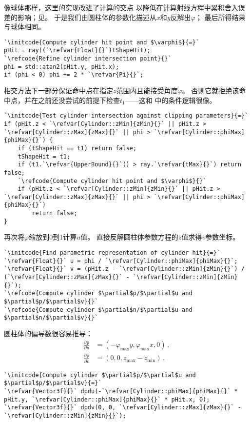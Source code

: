 像球体那样，这里的实现改进了计算的交点
以降低在计算射线方程中累积舍入误差的影响；见。
于是我们由圆柱体的参数化描述从$x$和$y$反解出$\varphi$；
最后所得结果与球体相同。
\begin{lstlisting}
`\initcode{Compute cylinder hit point and $\varphi$}{=}`
pHit = ray((`\refvar{Float}{}`)tShapeHit);
`\refcode{Refine cylinder intersection point}{}`
phi = std::atan2(pHit.y, pHit.x);
if (phi < 0) phi += 2 * `\refvar{Pi}{}`;
\end{lstlisting}

相交方法下一部分保证命中点在指定$z$范围内且能接受角度$\varphi$。
否则它就拒绝该命中点，并在之前还没尝试的前提下检查$t_1$——这和
中的条件逻辑很像。
\begin{lstlisting}
`\initcode{Test cylinder intersection against clipping parameters}{=}`
if (pHit.z < `\refvar[Cylinder::zMin]{zMin}{}` || pHit.z > `\refvar[Cylinder::zMax]{zMax}{}` || phi > `\refvar[Cylinder::phiMax]{phiMax}{}`) {
    if (tShapeHit == t1) return false;
    tShapeHit = t1;
    if (t1.`\refvar{UpperBound}{}`() > ray.`\refvar{tMax}{}`) return false;
    `\refcode{Compute cylinder hit point and $\varphi$}{}`
    if (pHit.z < `\refvar[Cylinder::zMin]{zMin}{}` || pHit.z > `\refvar[Cylinder::zMax]{zMax}{}` || phi > `\refvar[Cylinder::phiMax]{phiMax}{}`)
        return false;
}
\end{lstlisting}

再次将$\varphi$缩放到0到1计算$u$值。
直接反解圆柱体参数方程的$z$值求得$v$参数坐标。
\begin{lstlisting}
`\initcode{Find parametric representation of cylinder hit}{=}`
`\refvar{Float}{}` u = phi / `\refvar[Cylinder::phiMax]{phiMax}{}`;
`\refvar{Float}{}` v = (pHit.z - `\refvar[Cylinder::zMin]{zMin}{}`) / (`\refvar[Cylinder::zMax]{zMax}{}` - `\refvar[Cylinder::zMin]{zMin}{}`);
`\refcode{Compute cylinder $\partial$p/$\partial$u and $\partial$p/$\partial$v}{}`
`\refcode{Compute cylinder $\partial$n/$\partial$u and $\partial$n/$\partial$v}{}`
\end{lstlisting}

圆柱体的偏导数很容易推导：
\begin{align*}
    \frac{\partial\bm p}{\partial u} & =(-\varphi_{\max}y,\varphi_{\max}x,0)\, , \\
    \frac{\partial\bm p}{\partial v} & =(0,0,z_{\max}-z_{\min})\, .
\end{align*}
\begin{lstlisting}
`\initcode{Compute cylinder $\partial$p/$\partial$u and $\partial$p/$\partial$v}{=}`
`\refvar{Vector3f}{}` dpdu(-`\refvar[Cylinder::phiMax]{phiMax}{}` * pHit.y, `\refvar[Cylinder::phiMax]{phiMax}{}` * pHit.x, 0);
`\refvar{Vector3f}{}` dpdv(0, 0, `\refvar[Cylinder::zMax]{zMax}{}` - `\refvar[Cylinder::zMin]{zMin}{}`);
\end{lstlisting}

